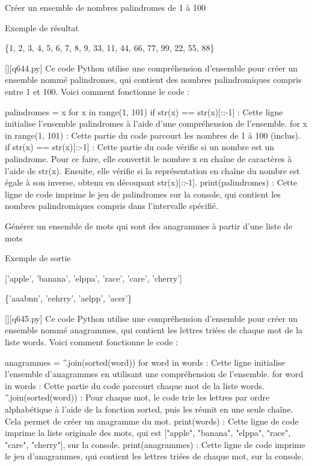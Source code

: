         \question
        Créer un ensemble de nombres palindromes de 1 à 100

Exemple de résultat

\{1, 2, 3, 4, 5, 6, 7, 8, 9, 33, 11, 44, 66, 77, 99, 22, 55, 88\}
        \par
        \begin{solution}
            \renewcommand{\nomfichier}{q644.py}
            \pythonfile{\chemincode \nomfichier}[][\nomfichier]
            Ce code Python utilise une compréhension d'ensemble pour créer un ensemble nommé palindromes, qui contient des nombres palindromiques compris entre 1 et 100. Voici comment fonctionne le code :

    palindromes = {x for x in range(1, 101) if str(x) == str(x)[::-1]} : Cette ligne initialise l'ensemble palindromes à l'aide d'une compréhension de l'ensemble.
        for x in range(1, 101) : Cette partie du code parcourt les nombres de 1 à 100 (inclus).
        if str(x) == str(x)[::-1] : Cette partie du code vérifie si un nombre est un palindrome. Pour ce faire, elle convertit le nombre x en chaîne de caractères à l'aide de str(x). Ensuite, elle vérifie si la représentation en chaîne du nombre est égale à son inverse, obtenu en découpant str(x)[::-1].
    print(palindromes) : Cette ligne de code imprime le jeu de palindromes sur la console, qui contient les nombres palindromiques compris dans l'intervalle spécifié.
        \end{solution}
        

        \question
        Générer un ensemble de mots qui sont des anagrammes à partir d'une liste de mots

Exemple de sortie

['apple', 'banana', 'elppa', 'race', 'care', 'cherry']

\{'aaabnn', 'cehrry', 'aelpp', 'acer'\}
        \par
        \begin{solution}
            \renewcommand{\nomfichier}{q645.py}
            \pythonfile{\chemincode \nomfichier}[][\nomfichier]
            Ce code Python utilise une compréhension d'ensemble pour créer un ensemble nommé anagrammes, qui contient les lettres triées de chaque mot de la liste words. Voici comment fonctionne le code :

    anagrammes = {''.join(sorted(word)) for word in words} : Cette ligne initialise l'ensemble d'anagrammes en utilisant une compréhension de l'ensemble.
        for word in words : Cette partie du code parcourt chaque mot de la liste words.
        ''.join(sorted(word)) : Pour chaque mot, le code trie les lettres par ordre alphabétique à l'aide de la fonction sorted, puis les réunit en une seule chaîne. Cela permet de créer un anagramme du mot.
    print(words) : Cette ligne de code imprime la liste originale des mots, qui est ["apple", "banana", "elppa", "race", "care", "cherry"], sur la console.
    print(anagrammes) : Cette ligne de code imprime le jeu d'anagrammes, qui contient les lettres triées de chaque mot, sur la console.
        \end{solution}
        

